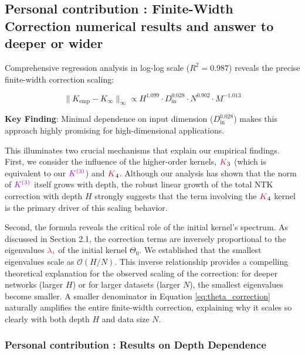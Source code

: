 \documentclass[a4paper]{article}
\theoremstyle{plain}
\theoremstyle{definition}
\theoremstyle{remark}
\begin{document}
\subsection{Personal contribution : Finite-Width Correction numerical results and answer to deeper or wider}

\begin{tcolorbox}[colback=blue!10,colframe=blue!60!black,title={\textbf{🎯 EMPIRICAL SCALING LAW}},enhanced,drop shadow]
Comprehensive regression analysis in log-log scale ($R^2 = 0.987$) reveals the precise finite-width correction scaling:

\begin{equation}
\|K_{\text{emp}} - K_{\infty}\|_\infty \propto H^{1.099} \cdot D_{\text{in}}^{0.028} \cdot N^{0.902} \cdot M^{-1.013}
\label{eq:scaling_law}
\end{equation}

\textbf{Key Finding}: Minimal dependence on input dimension ($D_{\text{in}}^{0.028}$) makes this approach highly promising for high-dimensional applications.
\end{tcolorbox}

This illuminates two crucial mechanisms that explain our empirical findings. First, we consider the influence of the higher-order kernels, $\textcolor{purple}{K}_3$ (which is equivalent to our $\textcolor{k3color}{K^{(3)}}$) and $\textcolor{purple}{K}_4$. Although our analysis has shown that the norm of $\textcolor{k3color}{K^{(3)}}$ itself grows with depth, the robust linear growth of the total NTK correction with depth $H$ strongly suggests that the term involving the $\textcolor{purple}{K}_4$ kernel is the primary driver of this scaling behavior.

Second, the formula reveals the critical role of the initial kernel's spectrum. As discussed in Section 2.1, the correction terms are inversely proportional to the eigenvalues $\textcolor{kernelcolor}{\lambda_i}$ of the initial kernel $\Theta_0$. We established that the smallest eigenvalues scale as $\mathcal{O}(H/N)$. This inverse relationship provides a compelling theoretical explanation for the observed scaling of the correction: for deeper networks (larger $H$) or for larger datasets (larger $N$), the smallest eigenvalues become smaller. A smaller denominator in Equation \ref{eq:theta_correction} naturally amplifies the entire finite-width correction, explaining why it scales so clearly with both depth $H$ and data size $N$.

\subsubsection{Personal contribution : Results on Depth Dependence}
\end{document}
